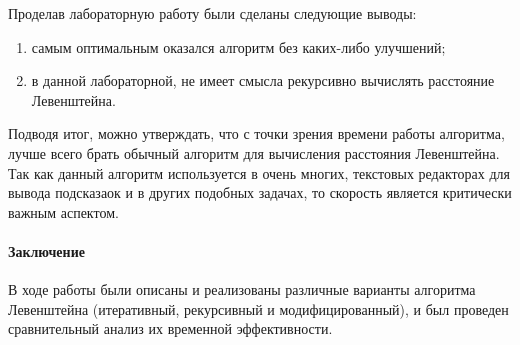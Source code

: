 \documentclass[utf8x, 12pt]{G7-32} %
\begin{document}
Проделав лабораторную работу были сделаны следующие выводы:
\begin{enumerate}
	\item самым оптимальным оказался алгоритм без каких-либо улучшений;
	\item в данной лабораторной, не имеет смысла рекурсивно вычислять расстояние Левенштейна.
\end{enumerate}
Подводя итог, можно утверждать, что с точки зрения времени работы алгоритма, лучше всего брать обычный алгоритм для вычисления расстояния Левенштейна. Так как данный алгоритм используется в очень многих, текстовых редакторах для вывода подсказаок и в других подобных задачах, то скорость является критически важным аспектом.

\paragraph{Заключение}

В ходе работы были описаны и реализованы различные варианты алгоритма Левенштейна (итеративный, рекурсивный и модифицированный), и был проведен сравнительный анализ их временной эффективности.

\backmatter %

\appendix   %
\end{document}
